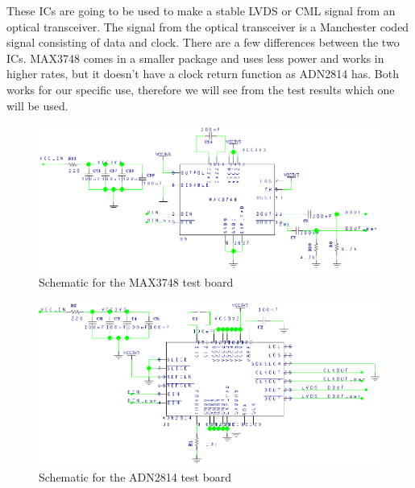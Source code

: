 \documentclass[12pt]{article}
\numberwithin{figure}{section}
\begin{document}
These \ac{IC}s are going to be used to make a stable \ac{LVDS} or \ac{CML} signal from an optical transceiver.
The signal from the optical transceiver is a Manchester coded signal consisting of data and clock.
There are a few differences between the two \ac{IC}s. MAX3748 comes in a smaller package and uses less power and works in higher rates, but it doesn't have a clock return function as ADN2814 has.
Both works for our specific use, therefore we will see from the test results which one will be used.

\begin{figure}[!htbp]
  \centering
  \includegraphics[width=\textwidth]{MAX3748_sch.png}
  \caption{Schematic for the MAX3748 test board}
  \label{MAX3748_sch}
\end{figure}

\begin{figure}[!htbp]
  \centering
  \includegraphics[width=\textwidth]{ADN2814_sch.png}
  \caption{Schematic for the ADN2814 test board}
  \label{ADN2814_sch}
\end{figure}
\FloatBarrier
\end{document}

